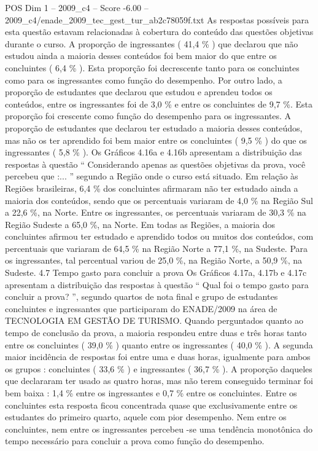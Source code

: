 \begin{textsample}{POS Dim 1 – 2009\_c4 – Score -6.00 – 2009\_c4/enade\_2009\_tec\_gest\_tur\_ab2c78059f.txt}
As respostas possíveis para esta questão estavam relacionadas à cobertura do conteúdo das questões objetivas durante o curso.
A proporção de ingressantes ( 41,4 \% ) que declarou que não estudou ainda a maioria desses conteúdos foi bem maior do que entre os concluintes ( 6,4 \% ).
Esta proporção foi decrescente tanto para os concluintes como para os ingressantes como função do desempenho.
Por outro lado, a proporção de estudantes que declarou que estudou e aprendeu todos os conteúdos, entre os ingressantes foi de 3,0 \% e entre os concluintes de 9,7 \%.
Esta proporção foi crescente como função do desempenho para os ingressantes.
A proporção de estudantes que declarou ter estudado a maioria desses conteúdos, mas não os ter aprendido foi bem maior entre os concluintes ( 9,5 \% ) do que os ingressantes ( 5,8 \% ).
Os Gráficos 4.16a e 4.16b apresentam a distribuição das respostas à questão “ Considerando apenas as questões objetivas da prova, você percebeu que :... ” segundo a Região onde o curso está situado.
Em relação às Regiões brasileiras, 6,4 \% dos concluintes afirmaram não ter estudado ainda a maioria dos conteúdos, sendo que os percentuais variaram de 4,0 \% na Região Sul a 22,6 \%, na Norte.
Entre os ingressantes, os percentuais variaram de 30,3 \% na Região Sudeste a 65,0 \%, na Norte.
Em todas as Regiões, a maioria dos concluintes afirmou ter estudado e aprendido todos ou muitos dos conteúdos, com percentuais que variaram de 64,5 \% na Região Norte a 77,1 \%, na Sudeste.
Para os ingressantes, tal percentual variou de 25,0 \%, na Região Norte, a 50,9 \%, na Sudeste. 4.7 Tempo gasto para concluir a prova Os Gráficos 4.17a, 4.17b e 4.17c apresentam a distribuição das respostas à questão “ Qual foi o tempo gasto para concluir a prova? ”, segundo quartos de nota final e grupo de estudantes concluintes e ingressantes que participaram do ENADE/2009 na área de TECNOLOGIA EM GESTÃO DE TURISMO.
Quando perguntados quanto ao tempo de conclusão da prova, a maioria respondeu entre duas e três horas tanto entre os concluintes ( 39,0 \% ) quanto entre os ingressantes ( 40,0 \% ).
A segunda maior incidência de respostas foi entre uma e duas horas, igualmente para ambos os grupos : concluintes ( 33,6 \% ) e ingressantes ( 36,7 \% ).
A proporção daqueles que declararam ter usado as quatro horas, mas não terem conseguido terminar foi bem baixa : 1,4 \% entre os ingressantes e 0,7 \% entre os concluintes.
Entre os concluintes esta resposta ficou concentrada quase que exclusivamente entre os estudantes do primeiro quarto, aquele com pior desempenho.
Nem entre os concluintes, nem entre os ingressantes percebeu -se uma tendência monotônica do tempo necessário para concluir a prova como função do desempenho.

\end{textsample}

